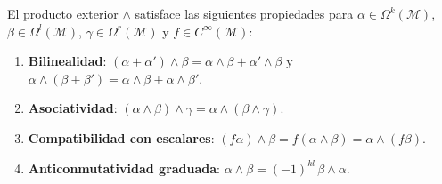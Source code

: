 \begin{proposition}\label{prop:propiedades_producto_exterior}
El producto exterior $\wedge$ satisface las siguientes propiedades para $\alpha \in \Omega^k(\mathcal{M})$, $\beta \in \Omega^l(\mathcal{M})$, $\gamma \in \Omega^r(\mathcal{M})$ y $f \in C^\infty(\mathcal{M})$:
\begin{enumerate}
    \item \textbf{Bilinealidad}: $(\alpha + \alpha') \wedge \beta = \alpha \wedge \beta + \alpha' \wedge \beta$ y $\alpha \wedge (\beta + \beta') = \alpha \wedge \beta + \alpha \wedge \beta'$.
    \item \textbf{Asociatividad}: $(\alpha \wedge \beta) \wedge \gamma = \alpha \wedge (\beta \wedge \gamma)$.
    \item \textbf{Compatibilidad con escalares}: $(f\alpha) \wedge \beta = f(\alpha \wedge \beta) = \alpha \wedge (f\beta)$.
    \item \textbf{Anticonmutatividad graduada}: $\alpha \wedge \beta = (-1)^{kl}\, \beta \wedge \alpha$.
\end{enumerate}
\end{proposition}

